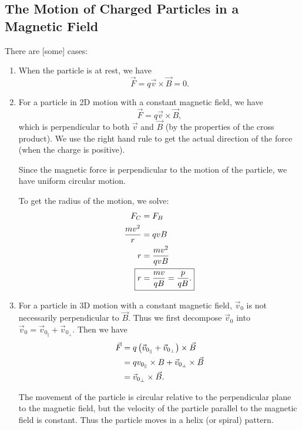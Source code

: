 \documentclass[class=article, crop=false]{standalone}
\begin{document}
  \subsection{The Motion of Charged Particles in a Magnetic Field}
  There are [some] cases:
  \begin{enumerate}[label=\roman*)]
    \item When the particle is at rest, we have
    \[
      \vec{F} = q\vec{v}\times \vec{B} = 0.
    \]
    \item For a particle in 2D motion with a constant magnetic field, we have
    \[
      \vec{F} = q\vec{v}\times \vec{B},
    \]
    which is perpendicular to both $\vec{v}$ and $\vec{B}$ (by the properties of the cross product). We use the right hand rule to get the actual direction of the force (when the charge is positive).
    \begin{note}{}
      Since the magnetic force is perpendicular to the motion of the particle, we have uniform circular motion.
    \end{note}
    To get the radius of the motion, we solve:
    \begin{align*}
      F_C &= F_B \\
      \frac{mv^2}{r} &= qvB \\
      r &= \frac{mv^2}{qvB} \\
      \Aboxed{r &= \frac{mv}{qB} = \frac{p}{qB}.}
    \end{align*}
    \item For a particle in 3D motion with a constant magnetic field, $\vec{v}_0$ is not necessarily perpendicular to $\vec{B}$. Thus we first decompose $\vec{v}_0$ into $\vec{v}_0 = \vec{v}_{0_\Vert} + \vec{v}_{0_\perp}$. Then we have
    \begin{align*}
      \vec{F} &= q\left( \vec{v}_{0_\Vert} + \vec{v}_{0_\perp} \right)\times \vec{B} \\
              &= qv_{0_\Vert}\times B + \vec{v}_{0_\perp}\times \vec{B} \\
              &= \vec{v}_{0_\perp}\times \vec{B}.
    \end{align*}
    \begin{note}{}
      The movement of the particle is circular relative to the perpendicular plane to the magnetic field, but the velocity of the particle parallel to the magnetic field is constant. Thus the particle moves in a helix (or spiral) pattern.
    \end{note}
  \end{enumerate}
\end{document}
